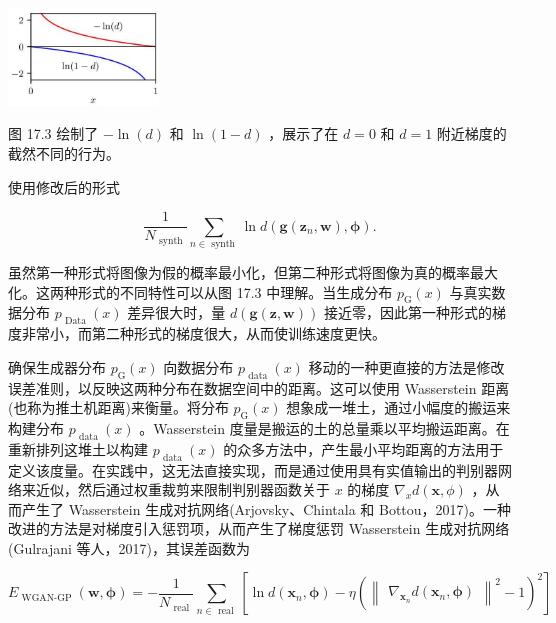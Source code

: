 \documentclass[10pt]{report}
\begin{document}
\begin{center}
\includegraphics[max width=0.3\textwidth]{images/0194e279-9b28-703a-88f4-c3ac21e2010d_557_1105_344_436_282_0.jpg}
\end{center}
\hspace*{3em} 

图 17.3 绘制了 \(- \ln \left( d\right)\) 和 \(\ln \left( {1 - d}\right)\) ，展示了在 \(d = 0\) 和 \(d = 1\) 附近梯度的截然不同的行为。

使用修改后的形式

\[
\frac{1}{{N}_{\text{ synth }}}\mathop{\sum }\limits_{{n \in  \text{ synth }}}\ln d\left( {\mathbf{g}\left( {{\mathbf{z}}_{n},\mathbf{w}}\right) ,\mathbf{\phi }}\right) . \tag{17.10}
\]

虽然第一种形式将图像为假的概率最小化，但第二种形式将图像为真的概率最大化。这两种形式的不同特性可以从图 17.3 中理解。当生成分布 \({p}_{\mathrm{G}}\left( x\right)\) 与真实数据分布 \({p}_{\text{ Data }}\left( x\right)\) 差异很大时，量 \(d\left( {\mathbf{g}\left( {\mathbf{z},\mathbf{w}}\right) }\right)\) 接近零，因此第一种形式的梯度非常小，而第二种形式的梯度很大，从而使训练速度更快。

确保生成器分布 \({p}_{\mathrm{G}}\left( x\right)\) 向数据分布 \({p}_{\text{ data }}\left( x\right)\) 移动的一种更直接的方法是修改误差准则，以反映这两种分布在数据空间中的距离。这可以使用 Wasserstein 距离(也称为推土机距离)来衡量。将分布 \({p}_{\mathrm{G}}\left( x\right)\) 想象成一堆土，通过小幅度的搬运来构建分布 \({p}_{\text{ data }}\left( x\right)\) 。Wasserstein 度量是搬运的土的总量乘以平均搬运距离。在重新排列这堆土以构建 \({p}_{\text{ data }}\left( x\right)\) 的众多方法中，产生最小平均距离的方法用于定义该度量。在实践中，这无法直接实现，而是通过使用具有实值输出的判别器网络来近似，然后通过权重裁剪来限制判别器函数关于 \(x\) 的梯度 \({\nabla }_{x}d\left( {\mathbf{x},\phi }\right)\) ，从而产生了 Wasserstein 生成对抗网络(Arjovsky、Chintala 和 Bottou，2017)。一种改进的方法是对梯度引入惩罚项，从而产生了梯度惩罚 Wasserstein 生成对抗网络(Gulrajani 等人，2017)，其误差函数为

\[
{E}_{\text{ WGAN-GP }}\left( {\mathbf{w},\mathbf{\phi }}\right)  =  - \frac{1}{{N}_{\text{ real }}}\mathop{\sum }\limits_{{n \in  \text{ real }}}\left\lbrack  {\ln d\left( {{\mathbf{x}}_{n},\mathbf{\phi }}\right)  - \eta {\left( {\begin{Vmatrix}{\nabla }_{{\mathbf{x}}_{n}}d\left( {\mathbf{x}}_{n},\mathbf{\phi }\right) \end{Vmatrix}}^{2} - 1\right) }^{2}}\right\rbrack
\]
\end{document}
